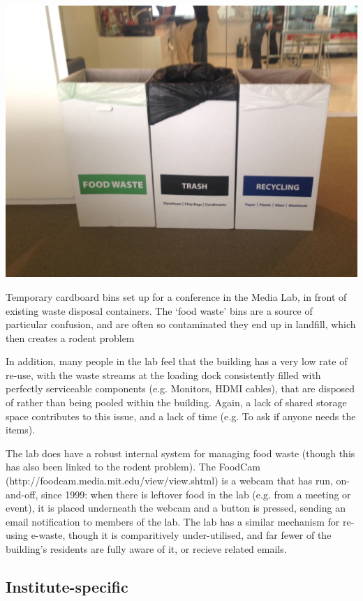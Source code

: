 \documentclass[nofonts,nols,justified,nobib]{tufte-book}
\begin{document}
\begin{marginfigure}
  \includegraphics[width=1\linewidth]{img/2/mit-bins/cardboard-bins.jpg}
  \caption{Temporary cardboard bins set up for a conference in the Media Lab, in front of existing waste disposal containers. The `food waste' bins are a source of particular confusion, and are often so contaminated they end up in landfill, which then creates a rodent problem}
\end{marginfigure}

In addition, many people in the lab feel that the building has a very low rate of re-use, with the waste streams at the loading dock consistently filled with perfectly serviceable components (e.g. Monitors, HDMI cables), that are disposed of rather than being pooled within the building. Again, a lack of shared storage space contributes to this issue, and a lack of time (e.g. To ask if anyone needs the items). 

The lab does have a robust internal system for managing food waste (though this has also been linked to the rodent problem). The FoodCam (http://foodcam.media.mit.edu/view/view.shtml) is a webcam that has run, on-and-off, since 1999: when there is leftover food in the lab (e.g. from a meeting or event), it is placed underneath the webcam and a button is pressed, sending an email notification to members of the lab. The lab has a similar mechanism for re-using e-waste, though it is comparitively under-utilised, and far fewer of the building's residents are fully aware of it, or recieve related emails.

\subsection*{Institute-specific}
\end{document}
